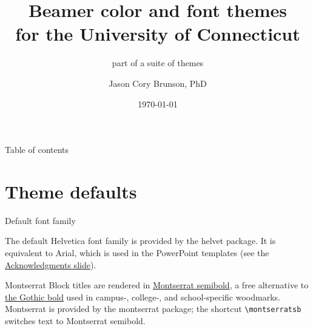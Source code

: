 \documentclass{beamer}
\title[Beamer colors and fonts for UConn]{Beamer color and font themes\\ for the University of Connecticut}
\subtitle{part of a suite of themes}
\author[Cory Brunson]{Jason Cory Brunson, PhD}
\institute[UConn Health]{Center for Quantitative Medicine\\ University of Connecticut School of Medicine}
\date{\today}
\begin{document}
\begin{frame}
\titlepage
\end{frame}


\begin{frame}{Table of contents}
\tableofcontents
\end{frame}


\section{Theme defaults}


\begin{frame}[fragile]{Default font family}

The default Helvetica font family is provided by the {\ttfamily helvet} package.
It is equivalent to Arial, which is used in the PowerPoint templates (see the \hyperlink{slide:acknowledgments}{Acknowledgments slide}).

\begin{block}{Montserrat}
Block titles are rendered in \href{http://mirrors.ibiblio.org/CTAN/fonts/montserrat/doc/montserrat-doc.pdf}{{\montserratsb Montserrat semibold}}, a free alternative to \href{https://brand.uconn.edu/standards/fonts/}{the Gothic bold} used in campus-, college-, and school-specific woodmarks.
Montserrat is provided by the {\ttfamily montserrat} package; the shortcut \verb|\montserratsb| switches text to Montserrat semibold.
\end{block}

\end{frame}
\end{document}
